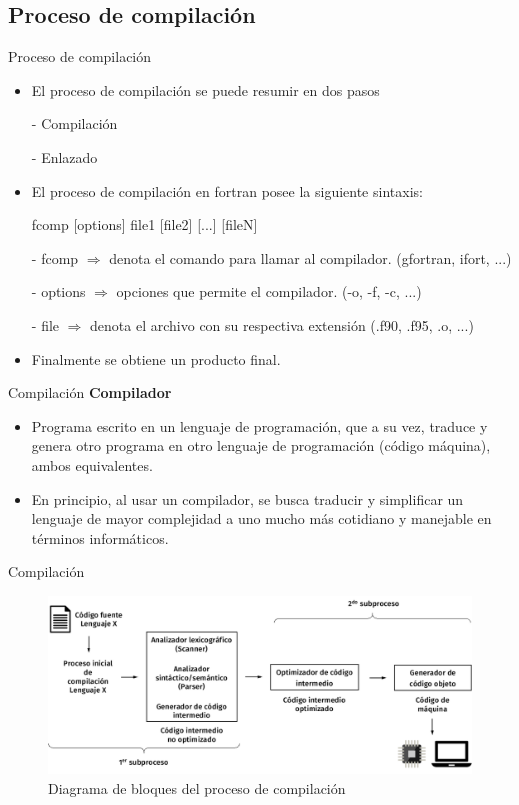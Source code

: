 
\subsection{Proceso de compilación}

\begin{frame}[fragile]{Proceso de compilación}
  \begin{itemize}[<+(1)->]
  \item  El proceso de compilación se puede resumir en dos pasos
  \hspace{1cm} \item [-] Compilación
  \hspace{1cm} \item [-] Enlazado

  \item El proceso de compilación en fortran posee la siguiente sintaxis:
  \item [] \begin{mintedbash} 
            fcomp [options] file1 [file2] [...] [fileN]
           \end{mintedbash}
  \item [-] fcomp $\Rightarrow$ denota el comando para llamar al compilador. (gfortran, ifort, ...)
  \item [-] options $\Rightarrow$ opciones que permite el compilador. (-o, -f, -c, ...)
  \item [-] file $\Rightarrow$ denota el archivo con su respectiva extensión (.f90, .f95, .o, ...)    
  \item Finalmente se obtiene un producto final.
\end{itemize}
\end{frame}
  

\begin{frame}[fragile]{Compilación}
\textbf{Compilador}
  \begin{itemize}[<+(1)->]
  \item Programa  escrito en un lenguaje de programación, que a su vez, traduce y genera otro programa
en otro lenguaje de programación (código máquina), ambos equivalentes.
  \item En principio, al usar un compilador, se busca traducir y simplificar un lenguaje de mayor complejidad a uno mucho más cotidiano y manejable en términos informáticos.
 \end{itemize}
\end{frame}


\begin{frame}[fragile]{Compilación} 
  \begin{figure}
    \includegraphics[width=1\textwidth]{./resources/compilation_op.png}
    \caption{Diagrama de bloques del proceso de compilación}
   \end{figure}
\end{frame}